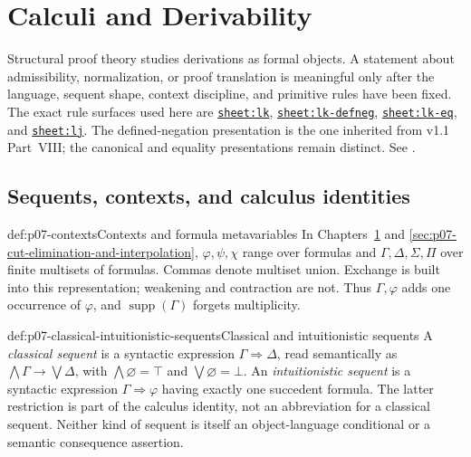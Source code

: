 
\chapter{Calculi and Derivability}
\label{sec:p07-calculi-and-derivability}

Structural proof theory studies derivations as formal objects.  A statement
about admissibility, normalization, or proof translation is meaningful only
after the language, sequent shape, context discipline, and primitive rules
have been fixed.  The exact rule surfaces used here are
\hyperref[sheet:lk]{\texttt{sheet:lk}},
\hyperref[sheet:lk-defneg]{\texttt{sheet:lk-defneg}},
\hyperref[sheet:lk-eq]{\texttt{sheet:lk-eq}}, and
\hyperref[sheet:lj]{\texttt{sheet:lj}}.  The defined-negation presentation
is the one inherited from v1.1 Part~VIII; the canonical and equality
presentations remain distinct.  See
\cite{Gentzen1934a,Gentzen1935b,TroelstraSchwichtenberg2000,
NegriVonPlato2001}.

\section{Sequents, contexts, and calculus identities}

\begin{hbconvention}{def:p07-contexts}{Contexts and formula metavariables}
In Chapters~\ref{sec:p07-calculi-and-derivability} and
\ref{sec:p07-cut-elimination-and-interpolation},
\(\varphi,\psi,\chi\) range over
formulas and \(\Gamma,\Delta,\Sigma,\Pi\) over finite multisets of formulas.
Commas denote multiset union.  Exchange is built into this representation;
weakening and contraction are not.  Thus \(\Gamma,\varphi\) adds one
occurrence of \(\varphi\), and \(\operatorname{supp}(\Gamma)\) forgets
multiplicity.
\end{hbconvention}

\begin{hbdefinition}{def:p07-classical-intuitionistic-sequents}{Classical and intuitionistic sequents}
A \emph{classical sequent} is a syntactic expression
\(\Gamma\Rightarrow\Delta\), read semantically as
\(\bigwedge\Gamma\to\bigvee\Delta\), with
\(\bigwedge\varnothing=\top\) and \(\bigvee\varnothing=\bot\).  An
\emph{intuitionistic sequent} is a syntactic expression
\(\Gamma\Rightarrow\varphi\) having exactly one succedent formula.  The latter
restriction is part of the calculus identity, not an abbreviation for a
classical sequent.  Neither kind of sequent is itself an object-language
conditional or a semantic consequence assertion.
\end{hbdefinition}

